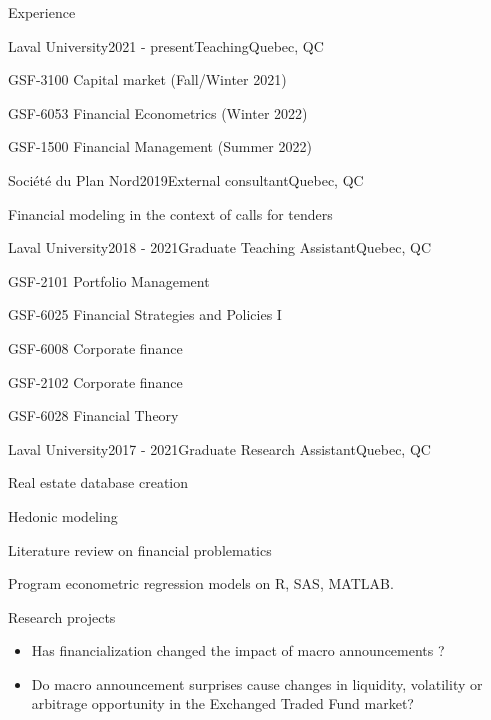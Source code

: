 \documentclass{resume} %
\begin{document}
\begin{rSection}{Experience}

\begin{rSubsection}{Laval University}{2021 - present}{Teaching}{Quebec, QC}
\item GSF-3100 Capital market (Fall/Winter 2021)
\item GSF-6053 Financial Econometrics (Winter 2022)
\item GSF-1500 Financial Management (Summer 2022)
\end{rSubsection}

\begin{rSubsection}{Société du Plan Nord}{2019}{External consultant}{Quebec, QC}
\item Financial modeling in the context of calls for tenders
\end{rSubsection}



\begin{rSubsection}{Laval University}{2018 - 2021}{Graduate Teaching Assistant}{Quebec, QC}
\item GSF-2101 Portfolio Management
\item GSF-6025 Financial Strategies and Policies I
\item GSF-6008 Corporate finance
\item GSF-2102 Corporate finance
\item GSF-6028 Financial Theory
\end{rSubsection}

\begin{rSubsection}{Laval University}{2017 - 2021}{Graduate Research Assistant}{Quebec, QC}
\item Real estate database creation
\item Hedonic modeling
\item Literature review on financial problematics
\item Program econometric regression models on R, SAS, MATLAB.
\end{rSubsection}

\end{rSection}


\begin{rSection}{Research projects}
\begin{itemize}
\item Has financialization changed the impact of macro announcements ?
\item  Do macro announcement surprises cause changes in liquidity, volatility or arbitrage opportunity in the Exchanged Traded Fund market?
\end{itemize}
\end{rSection}
\end{document}
